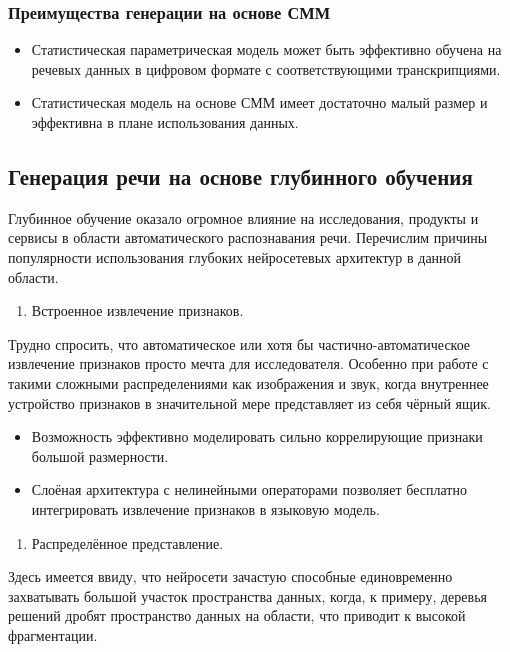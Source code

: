 \documentclass[../diploma.tex]{subfiles}
\begin{document}
\subsubsection{Преимущества генерации на основе СММ}
\begin{itemize}
    \item Статистическая параметрическая модель может быть эффективно обучена на речевых данных в цифровом формате с соответствующими транскрипциями.
    \item Статистическая модель на основе СММ имеет достаточно малый размер и эффективна в плане использования данных.
\end{itemize}

\subsection{Генерация речи на основе глубинного обучения}
    
    Глубинное обучение оказало огромное влияние на исследования, продукты и сервисы в области  автоматического распознавания речи. Перечислим причины популярности использования глубоких нейросетевых архитектур в данной области.
    
    \begin{enumerate}
        \item Встроенное извлечение признаков.
    \end{enumerate}    
    
    Трудно спросить, что автоматическое или хотя бы частично-автоматическое извлечение признаков просто мечта для исследователя. Особенно при работе с такими сложными распределениями как изображения и звук, когда внутреннее устройство признаков в значительной мере представляет из себя чёрный ящик.
    
        \begin{itemize}
            \item Возможность эффективно моделировать сильно коррелирующие признаки большой размерности. 
            \item Слоёная архитектура с нелинейными операторами позволяет бесплатно интегрировать извлечение признаков в языковую модель.
        \end{itemize}    
    
    \begin{enumerate}[resume]
        \item Распределённое представление.
    \end{enumerate}    
        Здесь имеется ввиду, что нейросети зачастую способные единовременно захватывать большой участок пространства данных, когда, к примеру, деревья решений дробят пространство данных на области, что приводит к высокой фрагментации. 
    
\end{document}
